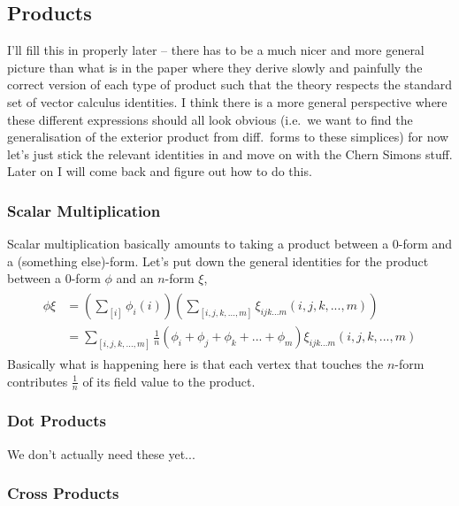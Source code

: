 \documentclass[11pt, oneside]{article} %
\numberwithin{equation}{section}
\begin{document}
\subsection{Products}

\begin{shaded}
    I'll fill this in properly later -- there has to be a much nicer and more general picture than what is in the paper \cite{schwalm_vector_1999} where they derive slowly and painfully the correct version of each type of product such that the theory respects the standard set of vector calculus identities. I think there is a more general perspective where these different expressions should all look obvious (i.e.~we want to find the generalisation of the exterior product from diff.~forms to these simplices) for now let's just stick the relevant identities in and move on with the Chern Simons stuff. Later on I will come back and figure out how to do this.
\end{shaded}

\subsubsection{Scalar Multiplication}


Scalar multiplication basically amounts to taking a product between a 0-form and a (something else)-form. Let's put down the general identities for the product between a 0-form $\phi$ and an $n$-form $\xi$,
\begin{align}\begin{aligned}
    \phi \xi &= 
    \left (
    \sum_{[i] } \phi_i (i)
    \right )
    \left (
    \sum_{[i,j,k,...,m] }\xi_{ijk...m} (i,j,k,...,m)
    \right ) \\
    &=\sum_{[i,j,k,...,m]}
    \frac 1n (\phi_i + \phi_j + \phi_k + ... + \phi_m)
    \xi_{ijk...m} (i,j,k,...,m)
\end{aligned}
\end{align}
Basically what is happening here is that each vertex that touches the $n$-form contributes $\frac 1n$ of its field value to the product. 



\subsubsection{Dot Products}
\begin{shaded}
    We don't actually need these yet...
\end{shaded}

\subsubsection{Cross Products}
\end{document}
